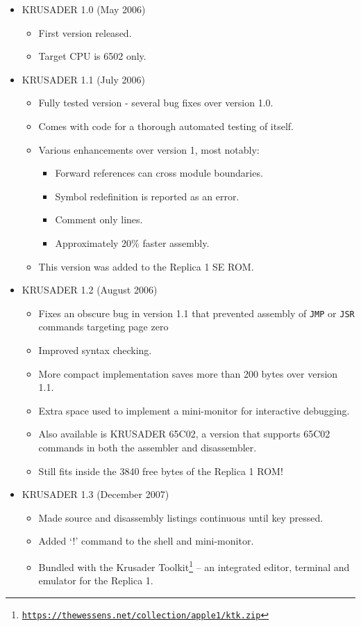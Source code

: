 \documentclass[12pt]{article}
\newcommand{\krusader}{\textsf{KRUSADER}\xspace}
\renewcommand{\url}[1]{\href{#1}{\texttt{#1}}}
\begin{document}
\begin{itemize}
	\item \krusader 1.0 (May 2006)
		\begin{itemize}
			\item First version released.
			\item Target CPU is 6502 only.
		\end{itemize}
	\item \krusader 1.1 (July 2006)
		\begin{itemize}
			\item Fully tested version - several bug fixes over version 1.0.
			\item Comes with code for a thorough automated testing of itself.
			\item Various enhancements over version 1, most notably:
			\begin{itemize}
				\item Forward references can cross module boundaries.
				\item Symbol redefinition is reported as an error.
				\item Comment only lines.
				\item Approximately 20\% faster assembly.
			\end{itemize}
			\item This version was added to the Replica 1 SE ROM.
		\end{itemize}
	\item \krusader 1.2 (August 2006)
		\begin{itemize}
			\item Fixes an obscure bug in version 1.1 that prevented assembly of \texttt{JMP}
				or \texttt{JSR} commands targeting page zero
			\item Improved syntax checking.
			\item More compact implementation saves more than 200 bytes over version 1.1.
			\item Extra space used to implement a mini-monitor for interactive debugging.
			\item Also available is KRUSADER 65C02, a version that supports 65C02
				commands in both the assembler and disassembler.
			\item Still fits inside the 3840 free bytes of the Replica 1 ROM!
		\end{itemize}
	\item \krusader 1.3 (December 2007)
		\begin{itemize}
			\item Made source and disassembly listings continuous until key pressed.
			\item  Added ‘!’ command to the shell and mini-monitor.
			\item Bundled with the Krusader Toolkit\footnote{\url{https://thewessens.net/collection/apple1/ktk.zip}} -- an integrated editor, terminal and emulator for the Replica 1.
		\end{itemize}
\end{itemize}
\end{document}
